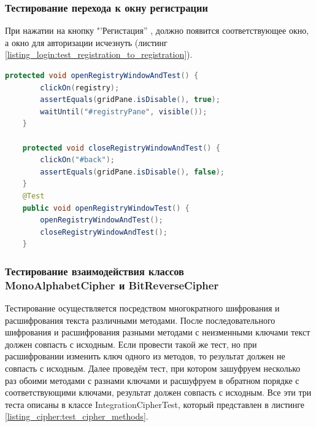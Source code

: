 \documentclass[a4paper,12pt]{article}
\begin{document}
\subsubsection{Тестирование перехода к окну регистрации}
При нажатии на кнопку "'Регистация'' , должно появится соответствующее окно, а окно для авторизации исчезнуть (листинг \ref{listing_login:test_registration_to_registration}). 
\begin{lstlisting}[language=java, caption=Тестирование перехода к окну регистрации, label=listing_login:test_registration_to_registration]
	protected void openRegistryWindowAndTest() {
        clickOn(registry);
        assertEquals(gridPane.isDisable(), true);
        waitUntil("#registryPane", visible());
    }

    protected void closeRegistryWindowAndTest() {
        clickOn("#back");
        assertEquals(gridPane.isDisable(), false);
    }     
    @Test
    public void openRegistryWindowTest() {
        openRegistryWindowAndTest();
        closeRegistryWindowAndTest();
    }
\end{lstlisting}

\newpage\subsubsection{Тестирование взаимодействия классов \\MonoAlphabetCipher и BitReverseCipher}
Тестирование осуществляется посредством многократного шифрования и расшифрования текста различными методами. После последовательного шифрования и расшифрования разными методами с неизменными ключами текст должен совпасть с исходным. Если провести такой же тест, но при расшифровании изменить ключ одного из методов, то результат должен не совпасть с исходным. Далее проведём тест, при котором зашуфруем несколько раз обоими методами с разнами ключами и расшуфруем в обратном порядке с соответствующими ключами, результат должен совпасть с исходным. Все эти три теста описаны в классе IntegrationCipherTest, который представлен в листинге \ref{listing_cipher:test_cipher_methods}.
\end{document}
